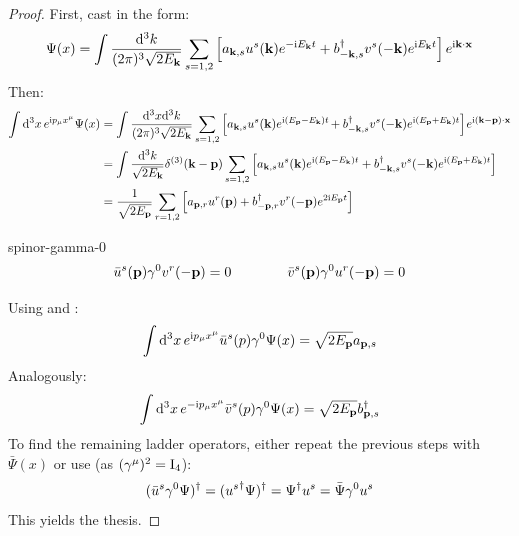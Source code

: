 \begin{proofbox}
  \begin{proof}
    First, cast  in the form:
    \begin{equation*}
      \Psi(x) = \int \frac{\mathrm{d}^3k}{(2\pi)^3 \sqrt{2E_{\mathbf{k}}}} \sum_{s = 1,2} \left[ a_{\mathbf{k},s} u^s(\mathbf{k}) e^{-\mathrm{i} E_{\mathbf{k}} t} + b_{-\mathbf{k},s}^\dagger v^s(-\mathbf{k}) e^{\mathrm{i} E_{\mathbf{k}} t} \right] e^{\mathrm{i} \mathbf{k} \cdot \mathbf{x}}
    \end{equation*}
    Then:
    \begin{equation*}
      \begin{split}
        \int \mathrm{d}^3x\, e^{\mathrm{i} p_\mu x^\mu} \Psi(x)
        & = \int \frac{\mathrm{d}^3x \mathrm{d}^3k}{(2\pi)^3 \sqrt{2E_{\mathbf{k}}}} \sum_{s = 1,2} \left[ a_{\mathbf{k},s} u^s(\mathbf{k}) e^{\mathrm{i} (E_{\mathbf{p}} - E_{\mathbf{k}}) t} \hspace{-0.1em} + b_{-\mathbf{k},s}^\dagger v^s(-\mathbf{k}) e^{\mathrm{i} (E_{\mathbf{p}} + E_{\mathbf{k}}) t} \right] \hspace{-0.1em} e^{\mathrm{i} (\mathbf{k} - \mathbf{p}) \cdot \mathbf{x}} \\
        & = \int \frac{\mathrm{d}^3k}{\sqrt{2E_{\mathbf{k}}}} \delta^{(3)}(\mathbf{k} - \mathbf{p}) \sum_{s = 1,2} \left[ a_{\mathbf{k},s} u^s(\mathbf{k}) e^{\mathrm{i} (E_{\mathbf{p}} - E_{\mathbf{k}}) t} + b_{-\mathbf{k},s}^\dagger v^s(-\mathbf{k}) e^{\mathrm{i} (E_{\mathbf{p}} + E_{\mathbf{k}}) t} \right] \\
        & = \frac{1}{\sqrt{2E_{\mathbf{p}}}} \sum_{r = 1,2} \left[ a_{\mathbf{p},r} u^r(\mathbf{p}) + b_{-\mathbf{p},r}^\dagger v^r(-\mathbf{p}) e^{2\mathrm{i} E_{\mathbf{p}} t} \right]
      \end{split}
    \end{equation*}

    \begin{lemma}[before upper = {\tcbtitle}, borderline = {1pt}{0pt}{blue!35!black}]{}{spinor-gamma-0}
      \begin{equation}
        \bar{u}^s(\mathbf{p}) \gamma^0 v^r(-\mathbf{p}) = 0
        \qquad \qquad
        \bar{v}^s(\mathbf{p}) \gamma^0 u^r(-\mathbf{p}) = 0
      \end{equation}
    \end{lemma}

    Using  and :
    \begin{equation*}
      \int \mathrm{d}^3x\, e^{\mathrm{i} p_\mu x^\mu} \bar{u}^s(p) \gamma^0 \Psi(x) = \sqrt{2E_{\mathbf{p}}} a_{\mathbf{p},s}
    \end{equation*}
    Analogously:
    \begin{equation*}
      \int \mathrm{d}^3x\, e^{-\mathrm{i} p_\mu x^\mu} \bar{v}^s(p) \gamma^0 \Psi(x) = \sqrt{2E_{\mathbf{p}}} b_{\mathbf{p},s}^\dagger
    \end{equation*}
    To find the remaining ladder operators, either repeat the previous steps with $ \bar{\Psi}(x) $ or use (as $ (\gamma^\mu)^2 = \mathrm{I}_4 $):
    \begin{equation}
      (\bar{u}^s \gamma^0 \Psi)^\dagger = ({u^s}^\dagger \Psi)^\dagger = \Psi^\dagger u^s = \bar{\Psi} \gamma^0 u^s
    \end{equation}
    This yields the thesis.
  \end{proof}
\end{proofbox}

